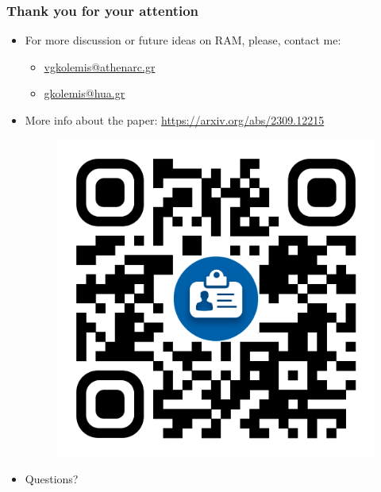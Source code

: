 \documentclass{beamer}
\begin{document}
\begin{frame}
  \frametitle{Thank you for your attention}
  \begin{itemize}
  \item For more discussion or future ideas on RAM, please, contact me:
    \begin{itemize}
    \item \href{vgkolemis@athenarc.gr}{vgkolemis@athenarc.gr}
    \item \href{gkolemis@hua.gr}{gkolemis@hua.gr}
    \end{itemize}
  \item More info about the paper: \href{https://arxiv.org/abs/2309.12215}{https://arxiv.org/abs/2309.12215}
\begin{figure}[htbp]
  \centering
  \includegraphics[width=.2\textwidth]{figures/publications}
\end{figure}
  \item Questions?
  \end{itemize}


\end{frame}



\end{document}
